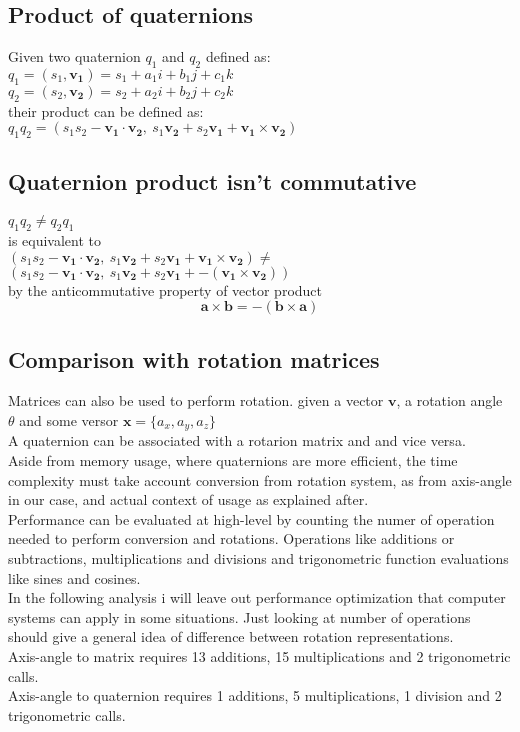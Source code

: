 \subsection{Product of quaternions}
Given two quaternion $q_1$ and $q_2$ defined as: \\
$q_1 = (s_1,\boldsymbol{v_1})=s_1+a_1i+b_1j+c_1k$ \\
$q_2=(s_2,\boldsymbol{v_2})=s_2+a_2i+b_2j+c_2k$ \\
their product can be defined as: \\
$q_1 q_2 = (s_1 s_2 - \boldsymbol{v_1 \cdot v_2}, \ s_1 \boldsymbol{v_2} + s_2 \boldsymbol{v_1} + \boldsymbol{v_1} \times \boldsymbol{v_2})$

\subsection{Quaternion product isn't commutative}
$q_1 q_2 \neq q_2 q_1$  \\
is equivalent to \\
$(s_1 s_2 - \boldsymbol{v_1 \cdot v_2}, \ s_1 \boldsymbol{v_2} + s_2 \boldsymbol{v_1} + \boldsymbol{v_1} \times \boldsymbol{v_2}) \neq $
$(s_1 s_2 - \boldsymbol{v_1 \cdot v_2}, \ s_1 \boldsymbol{v_2} + s_2 \boldsymbol{v_1} + - (\boldsymbol{v_1} \times \boldsymbol{v_2}))$ \\
by the anticommutative property of vector product \cite{amslaurea6701} \\
$$ \boldsymbol{a} \times \boldsymbol{b} = - (\boldsymbol{b} \times \boldsymbol{a}) $$ 

\subsection{Comparison with rotation matrices}
Matrices can also be used to perform rotation. \cite{} given a vector $\boldsymbol{v}$, a rotation angle $\theta$ and some versor $\boldsymbol{x}=\{a_x, a_y, a_z\}$  \\
A quaternion can be associated with a rotarion matrix and and vice versa. \cite{amslaurea6701,Eberly2016RotationRA} \\
Aside from memory usage, where quaternions are more efficient, the time complexity must take account conversion from rotation system, as from axis-angle in our case, and actual context of usage as explained after.  \\
Performance can be evaluated at high-level by counting the numer of operation needed to perform conversion and rotations. Operations like additions or subtractions, multiplications and divisions and trigonometric function evaluations like sines and cosines. \\
In the following analysis i will leave out performance optimization that computer systems can apply in some situations. Just looking at number of operations should give a general idea of difference between rotation representations. \\
Axis-angle to matrix requires 13 additions, 15 multiplications and 2 trigonometric calls. \\
Axis-angle to quaternion requires 1 additions, 5 multiplications, 1 division and 2 trigonometric calls. \\



